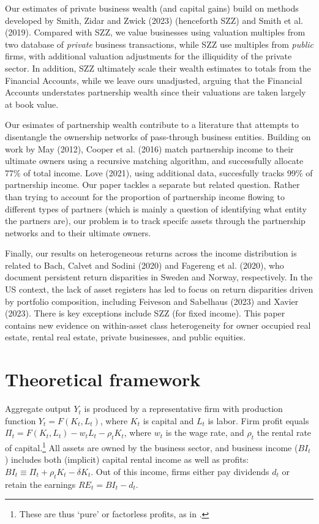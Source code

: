\documentclass[12pt]{article}
\begin{document}
Our estimates of private business wealth (and capital gains) build on methods developed by Smith, Zidar and Zwick (2023) (henceforth SZZ) and Smith et al. (2019). Compared with SZZ, we value businesses using valuation multiples from two database of \textit{private} business transactions, while SZZ use multiples from \textit{public} firms, with additional valuation adjustments for the illiquidity of the private sector. In addition, SZZ ultimately scale their wealth estimates to totals from the Financial Accounts, while we leave ours unadjusted, arguing that the Financial Accounts understates partnership wealth since their valuations are taken largely at book value. 

Our esimates of partnership wealth contribute to a literature that attempts to disentangle the ownership networks of pass-through business entities. Building on work by May (2012), Cooper et al. (2016) match partnership income to their ultimate owners using a recursive matching algorithm, and successfully allocate 77\% of total income. Love (2021), using additional data, succesfully tracks 99\% of partnership income. Our paper tackles a separate but related question. Rather than trying to account for the proportion of partnership income flowing to different types of partners (which is mainly a question of identifying what entity the partners are), our problem is to track specifc assets through the partnership networks and to their ultimate owners. 

Finally, our results on heterogeneous returns across the income distribution is related to Bach, Calvet and Sodini (2020) and Fagereng et al. (2020), who document persistent return disparities in Sweden and Norway, respectively. In the US context, the lack of asset registers has led to focus on return disparities driven by portfolio composition, including Feiveson and Sabelhaus (2023) and Xavier (2023). There is key exceptions include SZZ (for fixed income). This paper contains new evidence on within-asset class heterogeneity for owner occupied real estate, rental real estate, private businesses, and public equities. 

\section{Theoretical framework}


Aggregate output $Y_t$ is produced by a representative firm with production function $Y_t = F(K_t,L_t)$, where $K_t$ is capital and $L_t$ is labor. Firm profit equals $\Pi_t = F(K_t,L_t) - w_t L_t - \rho_t K_t$, where $w_t$ is the wage rate, and $\rho_t$ the rental rate of capital.\footnote{These are thus `pure' or factorless profits, as in \citet{karabarbounis2019accounting}.} All assets are owned by the business sector, and business income ($BI_t$) includes both (implicit) capital rental income as well as profits: $BI_t \equiv \Pi_t + \rho_t K_t - \delta K_t$. Out of this income, firms either pay dividends $d_t$ or retain the earnings $RE_t = BI_t - d_t$. 
\end{document}

